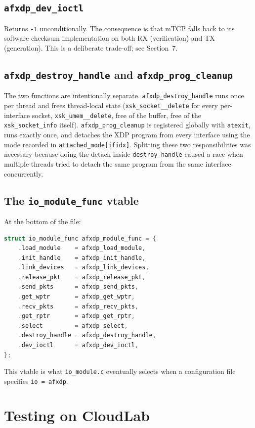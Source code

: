 \documentclass[10pt, letterpaper, twocolumn]{article}
\begin{document}
\subsection{\texttt{afxdp\_dev\_ioctl}}

Returns \texttt{-1} unconditionally. The consequence is that mTCP falls back to its software checksum implementation on both RX (verification) and TX (generation). This is a deliberate trade-off; see Section~7.

\subsection{\texttt{afxdp\_destroy\_handle} and \texttt{afxdp\_prog\_cleanup}}

The two functions are intentionally separate. \texttt{afxdp\_destroy\_handle} runs once per thread and frees thread-local state (\texttt{xsk\_socket\_\_delete} for every per-interface socket, \texttt{xsk\_umem\_\_delete}, free of the buffer, free of the \texttt{xsk\_socket\_info} itself). \texttt{afxdp\_prog\_cleanup} is registered globally with \texttt{atexit}, runs exactly once, and detaches the XDP program from every interface using the mode recorded in \texttt{attached\_mode[ifidx]}. Splitting these two responsibilities was necessary because doing the detach inside \texttt{destroy\_handle} caused a race when multiple threads tried to detach the same program from the same interface concurrently.

\subsection{The \texttt{io\_module\_func} vtable}

At the bottom of the file:
\begin{lstlisting}[language=C]
struct io_module_func afxdp_module_func = {
    .load_module    = afxdp_load_module,
    .init_handle    = afxdp_init_handle,
    .link_devices   = afxdp_link_devices,
    .release_pkt    = afxdp_release_pkt,
    .send_pkts      = afxdp_send_pkts,
    .get_wptr       = afxdp_get_wptr,
    .recv_pkts      = afxdp_recv_pkts,
    .get_rptr       = afxdp_get_rptr,
    .select         = afxdp_select,
    .destroy_handle = afxdp_destroy_handle,
    .dev_ioctl      = afxdp_dev_ioctl,
};
\end{lstlisting}
This vtable is what \texttt{io\_module.c} eventually selects when a configuration file specifies \texttt{io = afxdp}.

\section{Testing on CloudLab}
\end{document}
